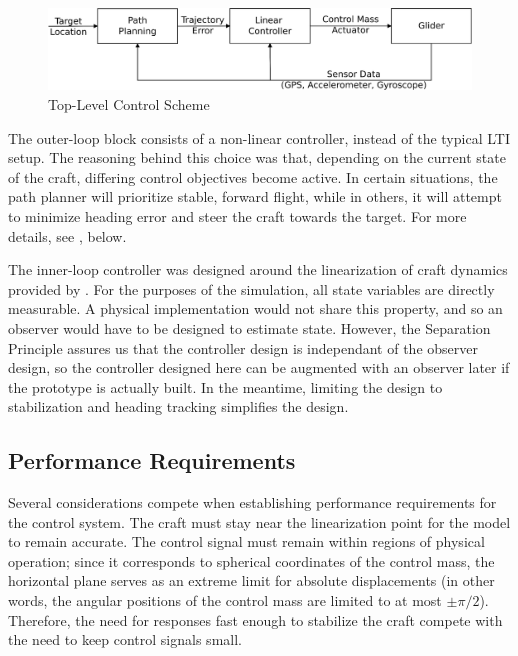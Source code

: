 \documentclass{sydeStyle}
\begin{document}
\begin{figure}[h!]
    \centering
    \includegraphics[width=0.8\columnwidth]{figs/flowchart}
    \caption{Top-Level Control Scheme}
    \label{fig:flowchart}
\end{figure}

The outer-loop block consists of a non-linear controller, instead of the typical
LTI setup.  The reasoning behind this choice was that, depending on the current
state of the craft, differing control objectives become active.  In
certain situations, the path planner will prioritize stable, forward flight,
while in others, it will attempt to minimize heading error and steer the craft
towards the target.  For more details, see , below.

The inner-loop controller was designed around the linearization of craft
dynamics provided by \cite{spottiswoode}.  For the purposes of the simulation,
all state variables are directly measurable.  A physical implementation would
not share this property, and so an observer would have to be designed to
estimate state.  However, the Separation Principle assures us that the
controller design is independant of the observer design, so the controller
designed here can be augmented with an observer later if the prototype is
actually built.  In the meantime, limiting the design to stabilization and
heading tracking simplifies the design.

\subsection{Performance Requirements}
\label{sec:perfreq}

Several considerations compete when establishing performance requirements for
the control system.  The craft must stay near the linearization point for the
model to remain accurate.  The control signal must remain within regions of
physical operation; since it corresponds to spherical coordinates of the control
mass, the horizontal plane serves as an extreme limit for absolute displacements
(in other words, the angular positions of the control mass are limited to at
most $\pm \pi/2$).  Therefore, the need for responses fast enough to stabilize
the craft compete with the need to keep control signals small.
\end{document}
